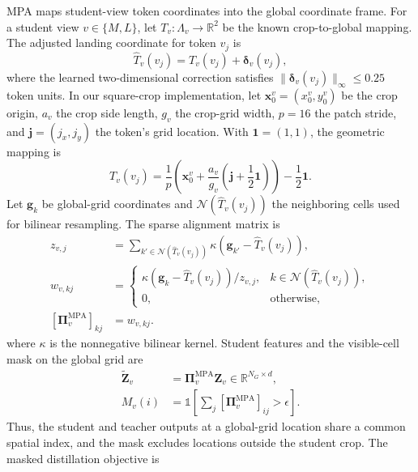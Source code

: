 \documentclass[conference]{IEEEtran}
\begin{document}
MPA maps student-view token coordinates into the global coordinate frame. For a student view $v\in\{M,L\}$, let $T_v:\Lambda_v\rightarrow\mathbb{R}^2$ be the known crop-to-global mapping. The adjusted landing coordinate for token $v_j$ is
\begin{equation}
    \widehat{T}_v(v_j)=T_v(v_j)+\boldsymbol{\delta}_v(v_j),
    \label{eq:mpa-coordinates}
\end{equation}
where the learned two-dimensional correction satisfies $\|\boldsymbol{\delta}_v(v_j)\|_{\infty}\leq0.25$ token units. In our square-crop implementation, let $\mathbf{x}_0^v=(x_0^v,y_0^v)$ be the crop origin, $a_v$ the crop side length, $g_v$ the crop-grid width, $p=16$ the patch stride, and $\mathbf{j}=(j_x,j_y)$ the token's grid location. With $\mathbf{1}=(1,1)$, the geometric mapping is
\begin{equation}
    T_v(v_j)=\frac{1}{p}\left(\mathbf{x}_0^v+\frac{a_v}{g_v}\left(\mathbf{j}+\frac12\mathbf{1}\right)\right)-\frac12\mathbf{1}.
    \label{eq:mpa-crop-map}
\end{equation}
Let $\mathbf{g}_k$ be global-grid coordinates and $\mathcal{N}(\widehat{T}_v(v_j))$ the neighboring cells used for bilinear resampling. The sparse alignment matrix is
\begin{equation}
    \begin{aligned}
    z_{v,j} &= \sum_{k'\in\mathcal{N}(\widehat{T}_v(v_j))}\kappa(\mathbf{g}_{k'}-\widehat{T}_v(v_j)),\\
    w_{v,kj} &= \begin{cases}
    \kappa(\mathbf{g}_k-\widehat{T}_v(v_j))/z_{v,j}, & k\in\mathcal{N}(\widehat{T}_v(v_j)),\\
    0, & \text{otherwise},
    \end{cases}\\
    [\boldsymbol{\Pi}^{\mathrm{MPA}}_v]_{kj} &= w_{v,kj}.
    \end{aligned}
    \label{eq:mpa-weights}
\end{equation}
where $\kappa$ is the nonnegative bilinear kernel. Student features and the visible-cell mask on the global grid are
\begin{align}
    \widetilde{\mathbf{Z}}_v &= \boldsymbol{\Pi}^{\mathrm{MPA}}_v\mathbf{Z}_v\in\mathbb{R}^{N_G\times d},\\
    M_v(i) &= \mathbb{1}\!\left[\sum_j[\boldsymbol{\Pi}^{\mathrm{MPA}}_v]_{ij}>\epsilon\right].
    \label{eq:mpa-alignment}
\end{align}
Thus, the student and teacher outputs at a global-grid location share a common spatial index, and the mask excludes locations outside the student crop. The masked distillation objective is
\end{document}
